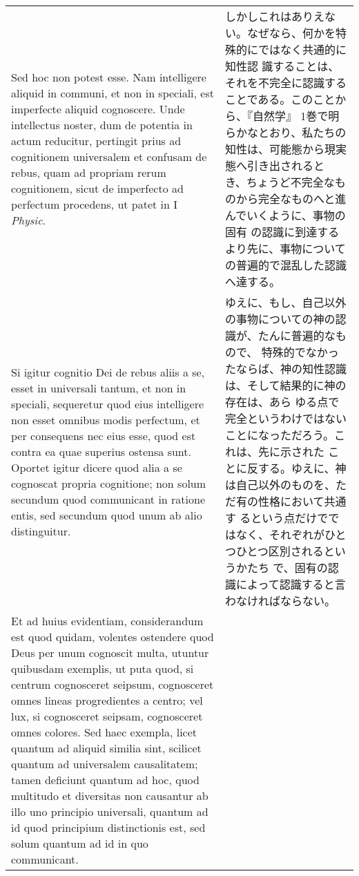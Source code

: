 \documentclass[10pt]{jsarticle} %
\begin{document}
\begin{longtable}{p{21em}p{21em}}
\\



Sed hoc non potest esse. Nam intelligere aliquid in communi, et
non in speciali, est imperfecte aliquid cognoscere. Unde intellectus
noster, dum de potentia in actum reducitur, pertingit prius ad
cognitionem universalem et confusam de rebus, quam ad propriam rerum
cognitionem, sicut de imperfecto ad perfectum procedens, ut patet in I
{\itshape Physic}. 

&

しかしこれはありえない。なぜなら、何かを特殊的にではなく共通的に知性認
識することは、それを不完全に認識することである。このことから、『自然学』
1巻で明らかなとおり、私たちの知性は、可能態から現実態へ引き出されると
き、ちょうど不完全なものから完全なものへと進んでいくように、事物の固有
の認識に到達するより先に、事物についての普遍的で混乱した認識へ達する。

\\

Si igitur cognitio Dei de rebus aliis a se, esset in universali
tantum, et non in speciali, sequeretur quod eius intelligere non esset
omnibus modis perfectum, et per consequens nec eius esse, quod est
contra ea quae superius ostensa sunt. Oportet igitur dicere quod alia a
se cognoscat propria cognitione; non solum secundum quod communicant in
ratione entis, sed secundum quod unum ab alio distinguitur. 

&

ゆえに、もし、自己以外の事物についての神の認識が、たんに普遍的なもので、
特殊的でなかったならば、神の知性認識は、そして結果的に神の存在は、あら
ゆる点で完全というわけではないことになっただろう。これは、先に示された
ことに反する。ゆえに、神は自己以外のものを、ただ有の性格において共通す
るという点だけでではなく、それぞれがひとつひとつ区別されるというかたち
で、固有の認識によって認識すると言わなければならない。

\\


Et ad huius
evidentiam, considerandum est quod quidam, volentes ostendere quod Deus
per unum cognoscit multa, utuntur quibusdam exemplis, ut puta quod, si
centrum cognosceret seipsum, cognosceret omnes lineas progredientes a
centro; vel lux, si cognosceret seipsam, cognosceret omnes colores. Sed
haec exempla, licet quantum ad aliquid similia sint, scilicet quantum ad
universalem causalitatem; tamen deficiunt quantum ad hoc, quod multitudo
et diversitas non causantur ab illo uno principio universali, quantum ad
id quod principium distinctionis est, sed solum quantum ad id in quo
communicant. 


\end{longtable}
\end{document}
